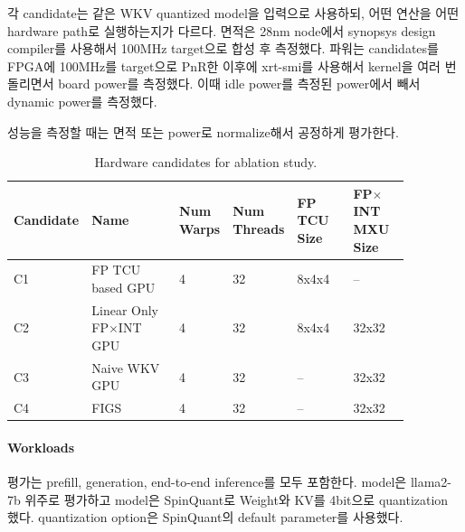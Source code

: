 \documentclass[11pt]{article}
\newcommand{\fpint}{FP$\times$INT}
\newcommand{\wkv}{WKV}
\newcommand{\Cone}{FP TCU based GPU}
\newcommand{\Ctwo}{Linear Only FP$\times$INT GPU}
\newcommand{\Cthr}{Naive WKV GPU}
\newcommand{\Cfou}{FIGS}
\begin{document}
각 candidate는 같은 \wkv{} quantized model을 입력으로 사용하되, 어떤 연산을 어떤 hardware path로 실행하는지가 다르다.
면적은 28nm node에서 synopsys design compiler를 사용해서 100MHz target으로 합성 후 측정했다.
파워는 candidates를 FPGA에 100MHz를 target으로 PnR한 이후에 xrt-smi를 사용해서 kernel을 여러 번 돌리면서 board power를 측정했다. 이때 idle power를 측정된 power에서 빼서 dynamic power를 측정했다.

성능을 측정할 때는 면적 또는 power로 normalize해서 공정하게 평가한다.


\begin{table}[H]
\centering
\caption{Hardware candidates for ablation study.}
\label{tab:candidates}
\begin{tabular}{p{0.12\linewidth}p{0.25\linewidth}p{0.10\linewidth}p{0.10\linewidth}p{0.15\linewidth}p{0.15\linewidth}}
\toprule
Candidate & Name & Num Warps & Num Threads & FP TCU Size & \fpint{} MXU Size \\
\midrule
C1 & \Cone{} & 4 & 32 & 8x4x4 & --  \\
C2 & \Ctwo{} & 4 & 32 & 8x4x4 & 32x32 \\
C3 & \Cthr{} & 4 & 32 & -- & 32x32 \\
C4 & \Cfou{} & 4 & 32 & -- & 32x32 \\
\bottomrule
\end{tabular}
\end{table}

\paragraph{Workloads}

평가는 prefill, generation, end-to-end inference를 모두 포함한다.
model은 llama2-7b 위주로 평가하고 model은 SpinQuant로 Weight와 KV를 4bit으로 quantization 했다. quantization option은 SpinQuant의 default parameter를 사용했다.
\end{document}
